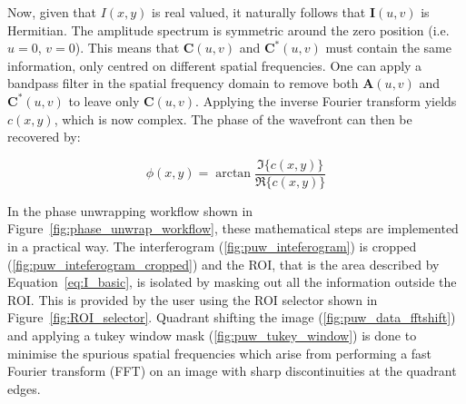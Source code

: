 Now, given that $I(x,y)$ is real valued, it naturally follows that $\boldsymbol{I}(u,v)$ is Hermitian. The amplitude spectrum is symmetric around the zero position (i.e. $u = 0$, $v = 0$). This means that $\boldsymbol{C}(u,v)$ and $\boldsymbol{C}^{*}(u,v)$ must contain the same information, only centred on different spatial frequencies. One can apply a bandpass filter in the spatial frequency domain to remove both $\boldsymbol{A}(u,v)$ and $\boldsymbol{C}^{*}(u,v)$ to leave only $\boldsymbol{C}(u,v)$.\cite{lewis1993absolute} Applying the inverse Fourier transform yields $c(x,y)$, which is now complex. The phase of the wavefront can then be recovered by:

\begin{equation}\label{eq:phase}
\phi(x,y) = \arctan \frac{\Im\{c(x,y)\}}{\Re\{c(x,y)\}}
\end{equation}

In the phase unwrapping workflow shown in Figure~\ref{fig:phase_unwrap_workflow}, these mathematical steps are implemented in a practical way. The interferogram (\ref{fig:puw_inteferogram}) is cropped (\ref{fig:puw_inteferogram_cropped}) and the ROI, that is the area described by Equation~\ref{eq:I_basic}, is isolated by masking out all the information outside the ROI. This is provided by the user using the ROI selector shown in Figure~\ref{fig:ROI_selector}. Quadrant shifting the image (\ref{fig:puw_data_fftshift}) and applying a tukey window mask (\ref{fig:puw_tukey_window}) is done to minimise the spurious spatial frequencies which arise from performing a fast Fourier transform (FFT) on an image with sharp discontinuities at the quadrant edges.

